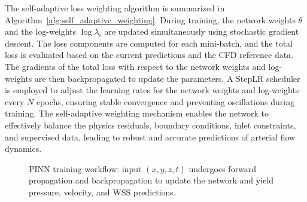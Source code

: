 \documentclass[12pt, a4paper]{article}
\begin{document}
The self-adaptive loss weighting algorithm is summarized in Algorithm~\ref{alg:self_adaptive_weighting}. During training, the network weights \(\theta\) and the log-weights \(\log \lambda_i\) are updated simultaneously using stochastic gradient descent. The loss components are computed for each mini-batch, and the total loss is evaluated based on the current predictions and the CFD reference data. The gradients of the total loss with respect to the network weights and log-weights are then backpropagated to update the parameters. A StepLR scheduler is employed to adjust the learning rates for the network weights and log-weights every \(N\) epochs, ensuring stable convergence and preventing oscillations during training. The self-adaptive weighting mechanism enables the network to effectively balance the physics residuals, boundary conditions, inlet constraints, and supervised data, leading to robust and accurate predictions of arterial flow dynamics.

\begin{figure}[htbp]
    \centering
    \caption{PINN training workflow: input \((x,y,z,t)\) undergoes forward propagation and backpropagation to update the network and yield pressure, velocity, and WSS predictions.}
    \label{fig:training_workflow}
\end{figure}
\end{document}
